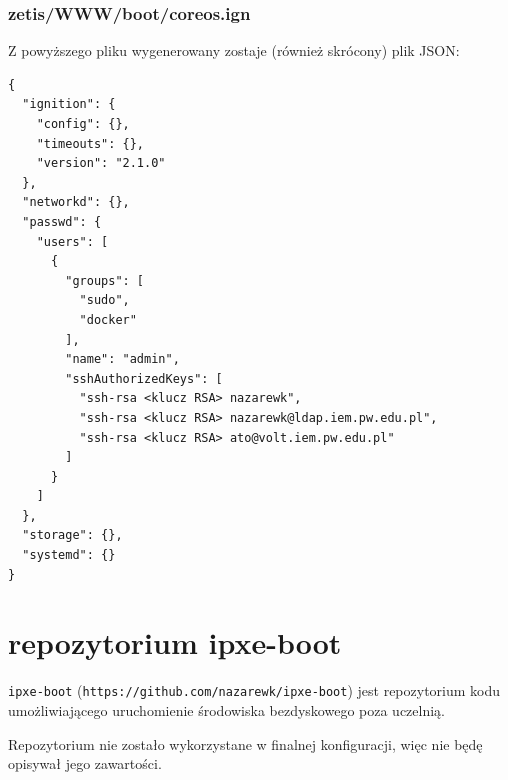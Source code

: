 \documentclass[a4paper,12pt,twoside,openany]{report}
\newcommand{\passthrough}[1]{#1}
\begin{document}
\hypertarget{zetiswwwbootcoreos.ign}{%
\subsubsection{zetis/WWW/boot/coreos.ign}\label{zetiswwwbootcoreos.ign}}

Z powyższego pliku wygenerowany zostaje (również skrócony) plik JSON:

\begin{lstlisting}
{
  "ignition": {
    "config": {},
    "timeouts": {},
    "version": "2.1.0"
  },
  "networkd": {},
  "passwd": {
    "users": [
      {
        "groups": [
          "sudo",
          "docker"
        ],
        "name": "admin",
        "sshAuthorizedKeys": [
          "ssh-rsa <klucz RSA> nazarewk",
          "ssh-rsa <klucz RSA> nazarewk@ldap.iem.pw.edu.pl",
          "ssh-rsa <klucz RSA> ato@volt.iem.pw.edu.pl"
        ]
      }
    ]
  },
  "storage": {},
  "systemd": {}
}
\end{lstlisting}

\hypertarget{repozytorium-ipxe-boot}{%
\section{repozytorium ipxe-boot}\label{repozytorium-ipxe-boot}}

\passthrough{\lstinline!ipxe-boot!}
(\passthrough{\lstinline!https://github.com/nazarewk/ipxe-boot!}) jest
repozytorium kodu umożliwiającego uruchomienie środowiska bezdyskowego
poza uczelnią.

Repozytorium nie zostało wykorzystane w finalnej konfiguracji, więc nie
będę opisywał jego zawartości.
\cleardoublepage
\end{document}
